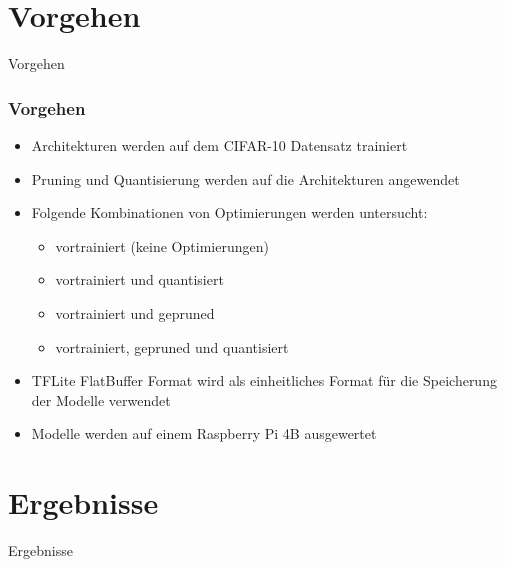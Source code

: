 \documentclass{beamer}
\begin{document}

\section{Vorgehen}
\begin{frame}
\huge
\centering
Vorgehen
\end{frame}


\begin{frame}
\frametitle{Vorgehen}

\begin{itemize}
	\item Architekturen werden auf dem CIFAR-10 Datensatz trainiert
	\item Pruning und Quantisierung werden auf die Architekturen angewendet
	\item Folgende Kombinationen von Optimierungen werden untersucht:
	\begin{itemize}
		\item vortrainiert (keine Optimierungen)
		\item vortrainiert und quantisiert
		\item vortrainiert und gepruned
		\item vortrainiert, gepruned und quantisiert
	\end{itemize}
	\item TFLite FlatBuffer Format wird als einheitliches Format für die Speicherung der Modelle verwendet
	\item Modelle werden auf einem Raspberry Pi 4B ausgewertet
\end{itemize}

\end{frame}




\section{Ergebnisse}
\begin{frame}
\huge
\centering
Ergebnisse
\end{frame}
\end{document}
